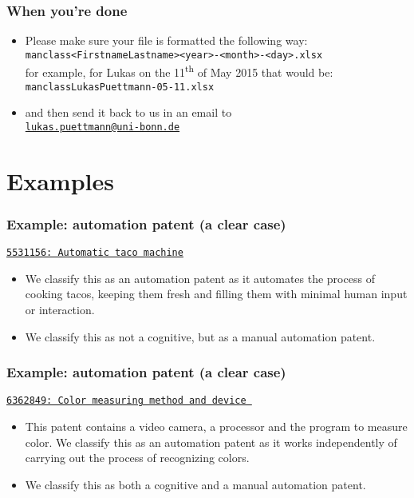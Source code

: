 \documentclass[10pt]{beamer}
\begin{document}
\begin{frame}\frametitle{When you're done}
	\begin{itemize}	
		\item Please make sure your file is formatted the following way:\\[0.1cm]
\texttt{manclass\textunderscore <FirstnameLastname>\textunderscore <year>-<month>-<day>.xlsx}\\[0.3cm]
		for example, for Lukas on the 11\textsuperscript{th} of May 2015 that would be:\\[0.1cm]
\texttt{manclass\textunderscore LukasPuettmann-05-11.xlsx}\\[0.3cm]
		\item and then send it back to us in an email to\\[0.1cm] \hspace{1cm}\href{mailto:lukas.puettmann@uni-bonn.de}{\texttt{lukas.puettmann@uni-bonn.de}}\\[0.1cm]
	\end{itemize}
\end{frame}



\section{Examples}
\setcounter{subsection}{1} %


\begin{frame}\frametitle{Example: automation patent (a clear case)}
\href{https://www.google.de/patents/US5531156?dq=5531156&hl=en&sa=X&ei=KPtRVd3vHYOssgGe2YGQDg&ved=0CCAQ6AEwAA}{\texttt{5531156: Automatic taco machine}}
	\begin{itemize}	
	\item We classify this as an automation patent as it automates the process of cooking tacos, keeping them fresh and filling them with minimal human input or interaction. 
	\item We classify this as not a cognitive, but as a manual automation patent.
	\end{itemize}
\end{frame}


\begin{frame}\frametitle{Example: automation patent (a clear case)}
\href{https://www.google.de/patents/US6362849?dq=6362849&hl=en&sa=X&ei=k-9RVZjJHMmcsgHbvYCIDA&ved=0CCAQ6AEwAA}{\texttt{6362849: Color measuring method and device }}
	\begin{itemize}	
	\item This patent contains a video camera, a processor and the program to measure color. We classify this as an automation patent as it works independently of carrying out the process of recognizing colors.
	\item We classify this as both a cognitive and a manual automation patent.
	\end{itemize}
\end{frame}
\end{document}
